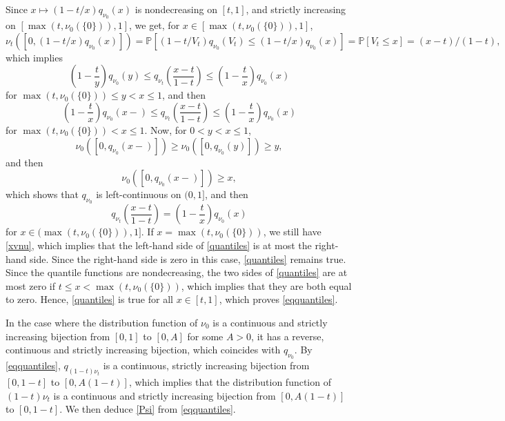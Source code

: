 \documentclass[11pt]{amsart}
\begin{document}
Since $x \mapsto (1-t/x) q_{\nu_0}(x)$ is nondecreasing on $[t,1]$, and 
strictly increasing on  
$[\max(t, \nu_0(\{0\})), 1]$,  
we get, for $x \in [\max(t, \nu_0(\{0\})), 1]$, 
\begin{equation}\mathbb{\nu}_t([0,(1-t/x) q_{\nu_0}(x)])
= \mathbb{P} [ (1 - t/V_t) q_{\nu_0}(V_t) 
\leq (1-t/x) q_{\nu_0}(x) ]
= \mathbb{P} [V_t \leq x] = (x-t)/(1-t),
\label{xvnu}
\end{equation}
which implies 
$$\left( 1 - \frac{t}{y} \right) 
q_{\nu_0}(y) \leq q_{\nu_t} \left( \frac{x-t}{1-t} \right)
\leq \left( 1 - \frac{t}{x} \right) 
q_{\nu_0}(x)
$$
for $\max(t, \nu_0(\{0\})) \leq y < x \leq 1$, 
and then 
$$ \left( 1 - \frac{t}{x} \right) 
q_{\nu_0}(x-) \leq q_{\nu_t} \left( \frac{x-t}{1-t} \right)
\leq \left( 1 - \frac{t}{x} \right) 
q_{\nu_0}(x)$$
for $\max(t, \nu_0(\{0\})) < x \leq 1$. 
Now, for $0 < y < x \leq 1$, 
$$\nu_0( [0, q_{\nu_0}(x-)]) 
\geq \nu_0( [0, q_{\nu_0}(y)]) \geq y,$$
and then 
$$\nu_0( [0, q_{\nu_0}(x-)]) \geq x,$$
which shows that $q_{\nu_0}$ is left-continuous on $(0,1]$, and then 
\begin{equation} q_{\nu_t} \left( \frac{x-t}{1-t} \right) 
= \left(1 - \frac{t}{x} \right) q_{\nu_0}(x)
\label{quantiles}
\end{equation}
for $x \in (\max(t, \nu_0(\{0\})), 1] $. 
If $x = \max(t, \nu_0(\{0\}))$, 
we still have \eqref{xvnu}, which implies that the left-hand side of \eqref{quantiles} is at most the right-hand side. Since the right-hand side is zero in this case, \eqref{quantiles} remains true. 
Since the quantile functions are nondecreasing, 
the two sides of \eqref{quantiles} are at most zero 
if $t \leq x <  \max(t, \nu_0(\{0\}))$, which implies that they are both equal to zero. Hence, 
\eqref{quantiles} is true for all $x \in [t, 1]$, 
which proves \eqref{eqquantiles}. 


In the case where the distribution function 
of $\nu_0$ is a continuous and strictly increasing bijection from $[0,1]$ to  $[0,A]$ for some $A > 0$,
it has a reverse, continuous and strictly increasing bijection, which coincides with $q_{\nu_0}$. By \eqref{eqquantiles}, 
$q_{(1-t)\nu_t}$ is a continuous, strictly increasing bijection from $[0, 1-t]$ to $[0, A(1-t)]$, which implies that the distribution 
function of $(1-t) \nu_t$ is a continuous and  strictly increasing bijection from $[0, A(1-t)]$ to $[0, 1-t]$. We then deduce \eqref{Psi} from \eqref{eqquantiles}. 
\end{document}
